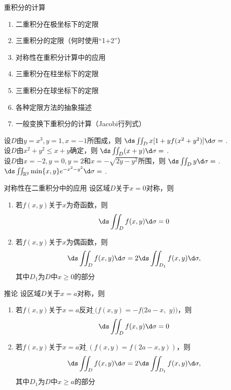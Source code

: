 \begin{frame}{重积分的计算}
	\linespread{1.2}
	\begin{enumerate}
	  \item 二重积分在极坐标下的定限
	  \item 三重积分的定限（何时使用“1+2”）
	  \item 对称性在重积分计算中的应用
	  \item 三重积分在柱坐标下的定限
	  \item 三重积分在球坐标下的定限
	  \item 各种定限方法的抽象描述
	  \item 一般变换下重积分的计算（Jacobi行列式）
	\end{enumerate}
\end{frame}

\begin{frame}
	\linespread{1.5}
	设$D$由$y=x^3,y=1,x=-1$所围成，则
	$\ds\iint_Dx[1+yf(x^2+y^2)]\d\sigma=$
	\underline{\;}.\\[1em]
	
	设$D$由$x^2+y^2\leq x+y$确定，则
	$\ds\iint_D(x+y)\d\sigma=$
	\underline{\;}.\\[1em]
	
	设$D$由$x=-2,y=0,y=2$和$x=-\sqrt{2y-y^2}$所围，则
	$\ds\iint_Dy\d\sigma=$
	\underline{\;}.\\[1em]
	
	$\ds\iint_{\mathbb{R}^2}\min\{x,y\}e^{-x^2-y^2}\d\sigma=$
	\underline{\;}.
\end{frame}

\begin{frame}
	\linespread{1.5}
	\it
	\begin{exampleblock}{对称性在二重积分中的应用}
		设区域$D$关于$x=0$对称，则
		\begin{enumerate}
		  \item 若$f(x,y)$关于$x$为奇函数，则
		  $$\ds\iint_Df(x,y)\d\sigma=0$$
		  \item \pause 若$f(x,y)$关于$x$为偶函数，则
		  $$\ds\iint_{D}f(x,y)\d\sigma=2\ds\iint_{D_1}f(x,y)\d\sigma,$$
		  其中$D_1$为$D$中$x\geq0$的部分
		\end{enumerate}
	\end{exampleblock}
\end{frame}

\begin{frame}
	\linespread{1.5}
	\it
	\begin{block}{推论}
		设区域$D$关于$x=a$对称，则
		\begin{enumerate}
		  \item 若$f(x,y)$关于$x=a$反对称{\b $(f(x,y)=-f(2a-x,$
		  $y))$}，则
		  $$\ds\iint_Df(x,y)\d\sigma=0$$
		  \item \pause 若$f(x,y)$关于$x=a$对称{\b $(f(x,y)=f(2a-x,y))$}，则
		  $$\ds\iint_{D}f(x,y)\d\sigma=2\ds\iint_{D_1}f(x,y)\d\sigma,$$
		  其中$D_1$为$D$中$x\geq a$的部分
		\end{enumerate}
	\end{block}
\end{frame}

